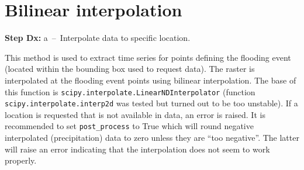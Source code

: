 \documentclass[10pt,a4paper,titlepage,parskip]{scrartcl}
\begin{document}
\clearpage

\section{Bilinear interpolation}

\textbf{Step Dx:} a~--~Interpolate data to specific location.

This method is used to extract time series for points defining the flooding event (located within the bounding box used to request data). The raster is interpolated at the flooding event points using bilinear interpolation. The base of this function is \texttt{scipy.interpolate.LinearNDInterpolator} (function \texttt{scipy.interpolate.interp2d} was tested but turned out to be too unstable). If a location is requested that is not available in data, an error is raised. It is recommended to set \texttt{post\_process} to True which will round negative interpolated (precipitation) data to zero unless they are ``too negative''. The latter will raise an error indicating that the interpolation does not seem to work properly.
\end{document}

